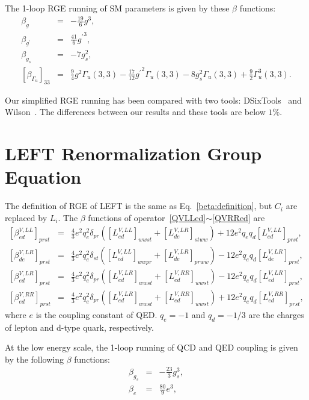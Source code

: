 \documentclass[a4paper,11pt]{article}
\begin{document}
The 1-loop RGE running of SM parameters is given by these $\beta$ functions:
\begin{eqnarray}
  \beta_{g} &=& -\frac{19}{6}g^3,  \\
  \beta_{g^\prime} &=& \frac{41}{6}{g^\prime}^3,  \\
  \beta_{g_s} &=& -7g^2_s, \\
  \left[\beta_{\Gamma_u}\right]_{33} &=& \frac{9}{4}g^2\Gamma_u(3,3)-\frac{17}{12} {g^\prime}^2\Gamma_u(3,3)-8g^2_s\Gamma_u(3,3)+\frac{9}{2}\Gamma^3_u(3,3).
\end{eqnarray}

Our simplified RGE running has been compared with two tools: DSixTools~\cite{Celis:2017hod,Fuentes-Martin:2020zaz} and Wilson~\cite{Aebischer:2018bkb}.
The differences between our results and these tools are below $1\%$.


\section{LEFT Renormalization Group Equation}\label{leftrge}

The definition of RGE of LEFT is the same as Eq.~\ref{beta:definition}, but $C_i$ are replaced by $L_i$.
The $\beta$ functions of operator~\ref{QVLLed}$\sim$\ref{QVRRed} are
\begin{eqnarray}
  \left[\beta^{V,LL}_{ed}\right]_{prst} &=& \frac{4}{3}e^2q^2_e\delta_{pr}\left([L^{V,LL}_{ed}]_{wwst}+[L^{V,LR}_{de}]_{stww}\right)+12e^2q_eq_d[L^{V,LL}_{ed}]_{prst},  \label{beta:VLLed} \\
  \left[\beta^{V,LR}_{de}\right]_{prst} &=& \frac{4}{3}e^2q^2_e\delta_{st}\left([L^{V,LL}_{ed}]_{wwpr}+[L^{V,LR}_{de}]_{prww}\right)-12e^2q_eq_d[L^{V,LR}_{de}]_{prst}, \label{beta:VLRde} \\
  \left[\beta^{V,LR}_{ed}\right]_{prst} &=& \frac{4}{3}e^2q^2_e\delta_{pr}\left([L^{V,LR}_{ed}]_{wwst}+[L^{V,RR}_{ed}]_{wwst}\right)-12e^2q_eq_d[L^{V,LR}_{ed}]_{prst}, \label{beta:VLRed} \\
  \left[\beta^{V,RR}_{ed}\right]_{prst} &=& \frac{4}{3}e^2q^2_e\delta_{pr}\left([L^{V,LR}_{ed}]_{wwst}+[L^{V,RR}_{ed}]_{wwst}\right)+12e^2q_eq_d[L^{V,RR}_{ed}]_{prst}, \label{beta:VRRed} 
\end{eqnarray}
where $e$ is the coupling constant of QED. 
$q_e=-1$ and $q_d=-1/3$ are the charges of lepton and d-type quark, respectively. 

At the low energy scale, the 1-loop running of QCD and QED coupling is given by the following $\beta$ functions:
\begin{eqnarray}
  \beta_{g_s} &=& -\frac{23}{3}g^3_s,  \\
  \beta_{e} &=& \frac{80}{9}e^3, 
\end{eqnarray}







		
		

		
\end{document}
